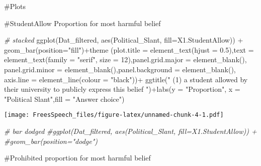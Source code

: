 \documentclass[
]{article}
\newenvironment{Shaded}{\begin{snugshade}}{\end{snugshade}}
\newcommand{\AttributeTok}[1]{\textcolor[rgb]{0.77,0.63,0.00}{#1}}
\newcommand{\CommentTok}[1]{\textcolor[rgb]{0.56,0.35,0.01}{\textit{#1}}}
\newcommand{\DecValTok}[1]{\textcolor[rgb]{0.00,0.00,0.81}{#1}}
\newcommand{\FloatTok}[1]{\textcolor[rgb]{0.00,0.00,0.81}{#1}}
\newcommand{\FunctionTok}[1]{\textcolor[rgb]{0.00,0.00,0.00}{#1}}
\newcommand{\NormalTok}[1]{#1}
\newcommand{\SpecialCharTok}[1]{\textcolor[rgb]{0.00,0.00,0.00}{#1}}
\newcommand{\StringTok}[1]{\textcolor[rgb]{0.31,0.60,0.02}{#1}}
\begin{document}
\#Plots

\#StudentAllow Proportion for most harmful belief

\begin{Shaded}
\begin{Highlighting}[]
\CommentTok{\# stacked}
\FunctionTok{ggplot}\NormalTok{(Dat\_filtered, }\FunctionTok{aes}\NormalTok{(Political\_Slant, }\AttributeTok{fill=}\NormalTok{X1.StudentAllow)) }\SpecialCharTok{+} 
  \FunctionTok{geom\_bar}\NormalTok{(}\AttributeTok{position=}\StringTok{"fill"}\NormalTok{)}\SpecialCharTok{+}\FunctionTok{theme}\NormalTok{ (}\AttributeTok{plot.title =} \FunctionTok{element\_text}\NormalTok{(}\AttributeTok{hjust =} \FloatTok{0.5}\NormalTok{),}\AttributeTok{text =} \FunctionTok{element\_text}\NormalTok{(}\AttributeTok{family =} \StringTok{"serif"}\NormalTok{, }\AttributeTok{size =} \DecValTok{12}\NormalTok{),}\AttributeTok{panel.grid.major =} \FunctionTok{element\_blank}\NormalTok{(), }\AttributeTok{panel.grid.minor =} \FunctionTok{element\_blank}\NormalTok{(),}\AttributeTok{panel.background =} \FunctionTok{element\_blank}\NormalTok{(), }\AttributeTok{axis.line =} \FunctionTok{element\_line}\NormalTok{(}\AttributeTok{colour =} \StringTok{"black"}\NormalTok{))}\SpecialCharTok{+}
\FunctionTok{ggtitle}\NormalTok{(}\StringTok{" (1) a student allowed by their university to publicly express this belief "}\NormalTok{)}\SpecialCharTok{+}\FunctionTok{labs}\NormalTok{(}\AttributeTok{y =} \StringTok{"Proportion"}\NormalTok{, }\AttributeTok{x =} \StringTok{"Political Slant"}\NormalTok{,}\AttributeTok{fill =} \StringTok{"Answer choice"}\NormalTok{)}
\end{Highlighting}
\end{Shaded}

\texttt{[image: FreesSpeech\_files/figure-latex/unnamed-chunk-4-1.pdf]}

\begin{Shaded}
\begin{Highlighting}[]
\CommentTok{\# bar dodged}
\CommentTok{\#ggplot(Dat\_filtered, aes(Political\_Slant, fill=X1.StudentAllow)) + }
  \CommentTok{\#geom\_bar(position="dodge")}
\end{Highlighting}
\end{Shaded}

\#Prohibited proportion for most harmful belief
\end{document}
